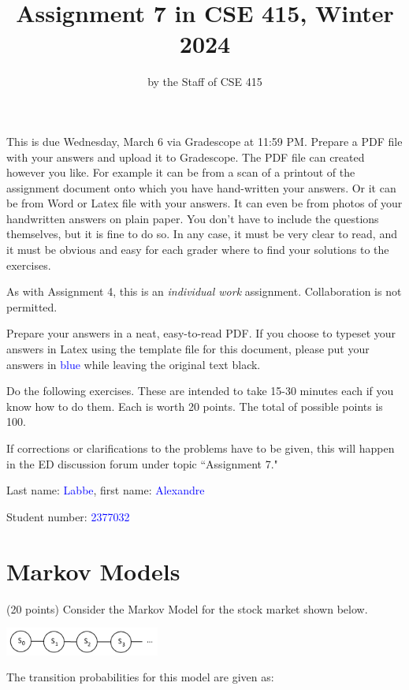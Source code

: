 \documentclass[12pt]{article}
\title{Assignment 7 in CSE 415, Winter 2024}
\author{by the Staff of CSE 415}
\date{}
\begin{document}
\maketitle
This is due Wednesday, March 6 via Gradescope at 11:59 PM. Prepare a PDF file with your answers and
upload it to Gradescope.
The PDF file can created however you like. For example it can be
from a scan of a printout of the assignment document onto which you
have hand-written your answers.  Or it can be from Word or Latex file
with your answers. It can even be from photos of your handwritten
answers on plain paper.  You don't have to include the questions
themselves, but it is fine to do so.
In any case, it must be very clear to read,
and it must be obvious and easy for each grader where to find your
solutions to the exercises.

As with Assignment 4, this is an
  {\it individual work} assignment.  Collaboration is not permitted.

Prepare your answers in a neat, easy-to-read
PDF.
If you choose to typeset your answers
in Latex using the template file for this document,
please put your answers in \textcolor{blue}{blue} while
leaving the original text black.

Do the following exercises.  These are intended to take
15-30 minutes each if you know how to do them. Each is worth
20 points. The total of possible points is 100.

If corrections or clarifications to the problems have to be given,
this will happen in the ED discussion forum under topic ``Assignment 7."


\vspace{1cm}
Last name: \textcolor{blue}{Labbe}, first name: \textcolor{blue}{Alexandre}

\vspace{1cm}
Student number: \textcolor{blue}{2377032}

\newpage
\section{Markov Models }

 (20 points) Consider the Markov Model for
the stock market shown below.

\begin{center}
  \includegraphics[width=2in]{MM-for-stocks.png}
\end{center}
The transition probabilities for this model are given as:
\end{document}
